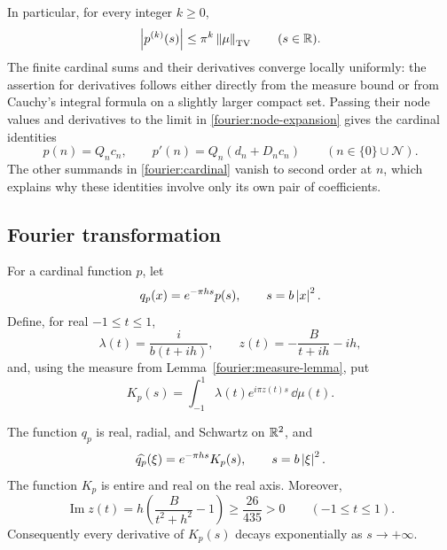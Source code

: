 In particular, for every integer \(k\ge0\),
\begin{equation}\label{fourier:derivative-bound}
 \left\lvert p^{(k)}(s)\right\rvert\le\pi^k\left\lVert\mu\right\rVert_{\mathrm{TV}}
 \qquad(s\in\mathbb R).
\end{equation}
The finite cardinal sums and their derivatives converge locally uniformly:
the assertion for derivatives follows either directly from the measure
bound or from Cauchy's integral formula on a slightly larger compact set.
Passing their node values and derivatives to the limit in
\eqref{fourier:node-expansion} gives the cardinal identities
\begin{equation}\label{fourier:node-values}
 p(n)=Q_nc_n,\qquad p'(n)=Q_n(d_n+D_nc_n)
 \qquad(n\in\{0\}\cup\mathcal N).
\end{equation}
The other summands in \eqref{fourier:cardinal} vanish to second order at
\(n\), which explains why these identities involve only its own pair of
coefficients.

\subsection{Fourier transformation}

For a cardinal function \(p\), let
\[
 q_p(x)=e^{-\pi hs}p(s),\qquad s=b\left\lvert x\right\rvert^2.
\]
Define, for real \(-1\le t\le1\),
\begin{equation}\label{fourier:frequencies}
 \lambda(t)=\frac{i}{b(t+ih)},\qquad
 z(t)=-\frac{B}{t+ih}-ih,
\end{equation}
and, using the measure from Lemma~\ref{fourier:measure-lemma}, put
\begin{equation}\label{fourier:kernel}
 K_p(s)=\int_{-1}^{1}\lambda(t)e^{i\pi z(t)s}\,\dd\mu(t).
\end{equation}

\begin{proposition}\label{fourier:transform}
The function \(q_p\) is real, radial, and Schwartz on \(\mathbb R^2\), and
\[
 \widehat{q_p}(\xi)=e^{-\pi hs}K_p(s),\qquad s=b\left\lvert\xi\right\rvert^2.
\]
The function \(K_p\) is entire and real on the real axis.  Moreover,
\begin{equation}\label{fourier:damping}
 \operatorname{Im}z(t)
   =h\left(\frac{B}{t^2+h^2}-1\right)
   \ge\frac{26}{435}>0\qquad(-1\le t\le1).
\end{equation}
Consequently every derivative of \(K_p(s)\) decays exponentially as
\(s\to+\infty\).
\end{proposition}


